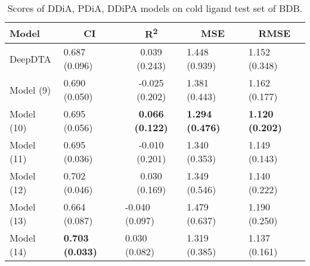 \begin{table}
\centering
\caption{Scores of DDiA, PDiA, DDiPA models on cold ligand test set of BDB.}
\vspace{0.25em}
\begin{tabular}{|l|l|c|l|l|} 
\hline
Model & \multicolumn{1}{c|}{CI} & R\textsuperscript{2} & \multicolumn{1}{c|}{MSE} & \multicolumn{1}{c|}{RMSE} \\ 
\hline
DeepDTA & 0.687 (0.096) & 0.039 (0.243) & 1.448 (0.939) & 1.152 (0.348) \\ 
\hline
Model (9) & 0.690 (0.050) & -0.025 (0.202) & 1.381 (0.443) & 1.162 (0.177) \\ 
\hline
Model (10) & 0.695 (0.056) & \textbf{0.066 (0.122)} & \textbf{1.294 (0.476)} & \textbf{1.120 (0.202)} \\ 
\hline
Model (11) & 0.695 (0.036) & -0.010 (0.201) & 1.340 (0.353) & 1.149 (0.143) \\ 
\hline
Model (12) & 0.702 (0.046) & 0.030 (0.169) & 1.349 (0.546) & 1.140 (0.222) \\ 
\hline
Model (13) & 0.664 (0.087) & \multicolumn{1}{l|}{-0.040 (0.097)} & 1.479 (0.637) & 1.190 (0.250) \\ 
\hline
Model (14) & \textbf{0.703 (0.033)} & \multicolumn{1}{l|}{0.030 (0.082)} & 1.319 (0.385) & 1.137 (0.161) \\
\hline
\end{tabular}
\label{tab:disease_cold_ligand}
\end{table}